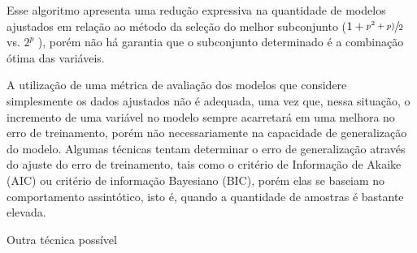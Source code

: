 Esse algoritmo apresenta uma redução expressiva na quantidade de modelos ajustados em relação ao método da 
seleção do melhor subconjunto ($1+\sfrac{p^2+p)}{2}$ vs. $2^p$ ), porém não há
garantia que o subconjunto determinado é a combinação ótima das variáveis. \cite[p. 208]{intro_stat_learn}

A utilização de uma métrica de avaliação dos modelos que considere simplesmente os dados ajustados não é adequada, 
uma vez que, nessa situação, o incremento de uma variável no modelo sempre acarretará em uma melhora no 
erro de treinamento, porém não necessariamente na capacidade de generalização do modelo. Algumas técnicas tentam 
determinar o erro de generalização através do ajuste do erro de treinamento, tais como o critério de Informação de 
Akaike (AIC) ou critério de informação Bayesiano (BIC), porém elas se baseiam no comportamento assintótico, isto é,
quando a quantidade de amostras é bastante elevada.

Outra técnica possível